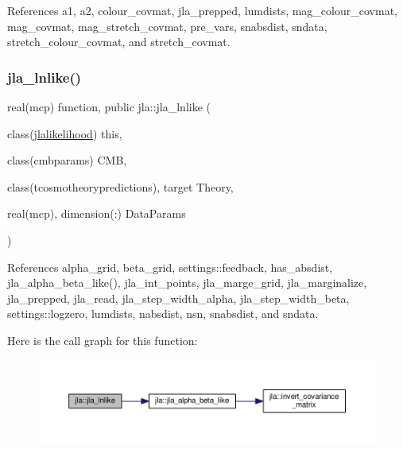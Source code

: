 References a1, a2, colour\+\_\+covmat, jla\+\_\+prepped, lumdists, mag\+\_\+colour\+\_\+covmat, mag\+\_\+covmat, mag\+\_\+stretch\+\_\+covmat, pre\+\_\+vars, snabsdist, sndata, stretch\+\_\+colour\+\_\+covmat, and stretch\+\_\+covmat.

\mbox{\label{namespacejla_a9a536b5f47c5314d3099af7ca66ec027}} 
\subsubsection{\texorpdfstring{jla\+\_\+lnlike()}{jla\_lnlike()}}
{\footnotesize\ttfamily real(mcp) function, public jla\+::jla\+\_\+lnlike (\begin{DoxyParamCaption}\item[{class(\mbox{\hyperlink{structjla_1_1jlalikelihood}{jlalikelihood}})}]{this,  }\item[{class(cmbparams)}]{C\+MB,  }\item[{class(tcosmotheorypredictions), target}]{Theory,  }\item[{real(mcp), dimension(\+:)}]{Data\+Params }\end{DoxyParamCaption})}



References alpha\+\_\+grid, beta\+\_\+grid, settings\+::feedback, has\+\_\+absdist, jla\+\_\+alpha\+\_\+beta\+\_\+like(), jla\+\_\+int\+\_\+points, jla\+\_\+marge\+\_\+grid, jla\+\_\+marginalize, jla\+\_\+prepped, jla\+\_\+read, jla\+\_\+step\+\_\+width\+\_\+alpha, jla\+\_\+step\+\_\+width\+\_\+beta, settings\+::logzero, lumdists, nabsdist, nsn, snabsdist, and sndata.

Here is the call graph for this function\+:
\nopagebreak
\begin{figure}[H]
\begin{center}
\leavevmode
\includegraphics[width=350pt]{namespacejla_a9a536b5f47c5314d3099af7ca66ec027_cgraph}
\end{center}
\end{figure}
\mbox{\label{namespacejla_a840bbaee909bef635242328944cb1a14}} 

